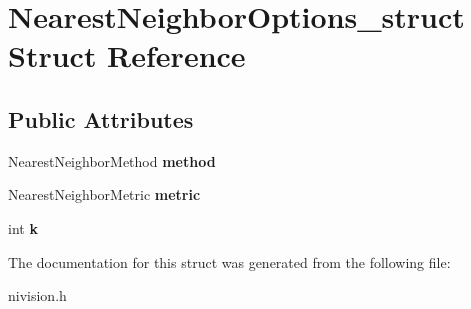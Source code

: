 \hypertarget{structNearestNeighborOptions__struct}{
\section{NearestNeighborOptions\_\-struct Struct Reference}
\label{structNearestNeighborOptions__struct}
}
\subsection*{Public Attributes}
\begin{DoxyCompactItemize}
\item 
\hypertarget{structNearestNeighborOptions__struct_a80dcc83d63450744d49273865cc53ff0}{
NearestNeighborMethod {\bfseries method}}
\label{structNearestNeighborOptions__struct_a80dcc83d63450744d49273865cc53ff0}

\item 
\hypertarget{structNearestNeighborOptions__struct_a54fe91388604fa6ac06c5da8418f3cab}{
NearestNeighborMetric {\bfseries metric}}
\label{structNearestNeighborOptions__struct_a54fe91388604fa6ac06c5da8418f3cab}

\item 
\hypertarget{structNearestNeighborOptions__struct_a03901f745fe1d29b8db42fb3514525f3}{
int {\bfseries k}}
\label{structNearestNeighborOptions__struct_a03901f745fe1d29b8db42fb3514525f3}

\end{DoxyCompactItemize}


The documentation for this struct was generated from the following file:\begin{DoxyCompactItemize}
\item 
nivision.h\end{DoxyCompactItemize}
